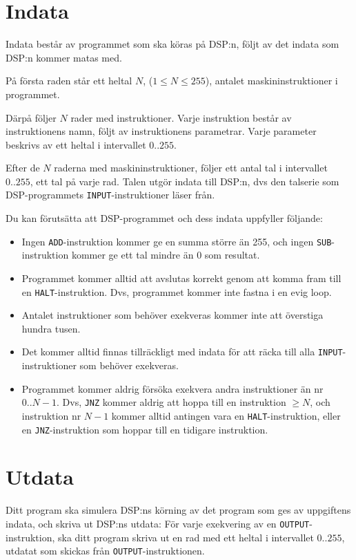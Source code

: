 \section*{Indata}
Indata består av programmet som ska köras på DSP:n, följt av det indata som DSP:n kommer matas med.

På första raden står ett heltal $N$, ($1 \leq N \leq 255$), antalet maskininstruktioner i programmet.

Därpå följer $N$ rader med instruktioner. Varje instruktion består av instruktionens namn, följt av instruktionens parametrar. Varje parameter beskrivs av ett heltal i intervallet $0..255$.

Efter de $N$ raderna med maskininstruktioner, följer ett antal tal i intervallet $0..255$, ett tal på varje rad.
Talen utgör indata till DSP:n, dvs den talserie som DSP-programmets \texttt{INPUT}-instruktioner läser från.

Du kan förutsätta att DSP-programmet och dess indata uppfyller följande:
\begin{itemize}
\item Ingen \texttt{ADD}-instruktion kommer ge en summa större än 255, och ingen \texttt{SUB}-instruktion kommer ge ett tal mindre än $0$ som resultat.
\item Programmet kommer alltid att avslutas korrekt genom att komma fram till en \texttt{HALT}-instruktion. Dvs, programmet kommer inte fastna i en evig loop.
\item Antalet instruktioner som behöver exekveras kommer inte att överstiga hundra tusen.
\item Det kommer alltid finnas tillräckligt med indata för att räcka till alla \texttt{INPUT}-instruktioner som behöver exekveras.
\item Programmet kommer aldrig försöka exekvera andra instruktioner än nr $0..N-1$. Dvs, \texttt{JNZ} kommer aldrig att hoppa till en instruktion $\ge N$, och instruktion nr $N-1$ kommer alltid antingen vara en \texttt{HALT}-instruktion, eller en \texttt{JNZ}-instruktion som hoppar till en tidigare instruktion. 
\end{itemize}

\section*{Utdata}
Ditt program ska simulera DSP:ns körning av det program som ges av uppgiftens indata, och skriva ut DSP:ns utdata: För varje exekvering av en \texttt{OUTPUT}-instruktion, ska ditt program skriva ut en rad med ett heltal i intervallet $0..255$, utdatat som skickas från \texttt{OUTPUT}-instruktionen. 

